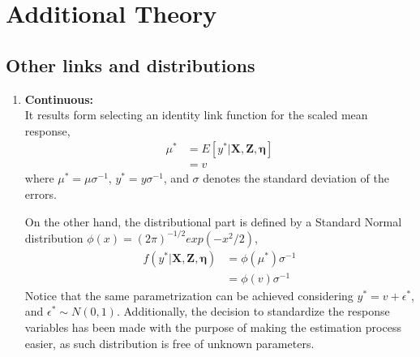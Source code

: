 \chapter{Additional Theory} \label{appA:additional}

\section{Other links and distributions}

\begin{enumerate}
	
	\item \textbf{Continuous:} \\
	It results form selecting an identity link function for the scaled mean response,
	\begin{equation} \label{eq:link_cont}
		\begin{split}
			\mu^{*} &= E[y^{*} | \mathbf{X}, \mathbf{Z}, \pmb{\eta}] \\ 
			&= v
		\end{split}
	\end{equation}
	where $\mu^{*} = \mu \sigma^{-1}$, $y^{*} = y \sigma^{-1}$, and $\sigma$ denotes the standard deviation of the errors.
	
	On the other hand, the distributional part is defined by a Standard Normal distribution $\phi(x)=(2 \pi)^{-1/2} exp(-x^{2}/2)$,
	\begin{equation} \label{eq:dist_cont}
		\begin{split}
			f(y^{*}| \mathbf{X}, \mathbf{Z}, \pmb{\eta}) &= \phi(\mu^{*}) \sigma^{-1} \\
			&= \phi(v) \sigma^{-1}
		\end{split}
	\end{equation}
	Notice that the same parametrization can be achieved considering $y^{*} = v + \epsilon^{*}$, and $\epsilon^{*} \sim N(0, 1)$.
	Additionally, the decision to standardize the response variables has been made with the purpose of making the estimation process easier, as such distribution is free of unknown parameters.
	
	

\end{enumerate}
